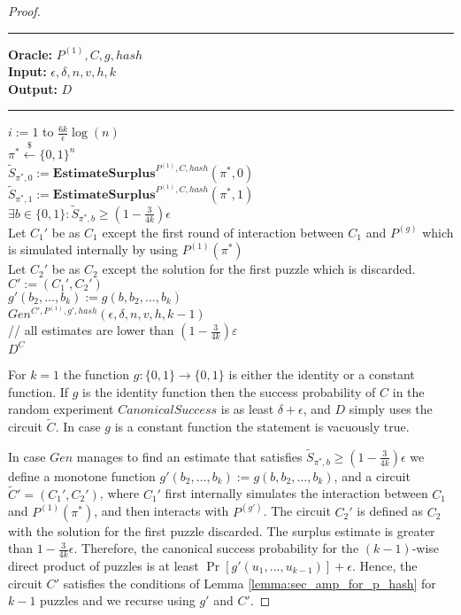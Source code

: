 \begin{proof}
\begin{codeblock}
  \medskip
  \hrule
  \medskip
  \textbf{Oracle:} $ P^{(1)}, C, g, hash$ \\
  \textbf{Input:}  $\epsilon, \delta, n, v, h, k$\\
  \textbf{Output:} $D$
  \medskip\hrule\medskip
  \For $i:=1$ to $\frac{6k}{\epsilon}\log(n)$ \Do \\
  \IndI $\pi^* \xleftarrow{\$} \{0,1\}^{n}$\\
  \IndI $\widetilde{S}_{\pi^*,0} := \textbf{EstimateSurplus}^{P^{(1)}, C, hash}(\pi^*, 0)$\\
  \IndI $\widetilde{S}_{\pi^*,1} := \textbf{EstimateSurplus}^{P^{(1)}, C, hash}(\pi^*, 1)$\\
  \IndI \If $ \exists b \in \{0,1\}: \widetilde{S}_{\pi^*,b} \geq (1 - \frac{3}{4k}) \epsilon$ \then \\
  \IndII Let $C_1'$ be as $C_1$ except the first round of interaction between $C_1$ and $P^{(g)}$ which \\
  \IndII is simulated internally by using $P^{(1)}(\pi^*)$\\
  \IndII Let $C_2'$ be as $C_2$ except the solution for the first puzzle which is discarded. \\
  \IndII $C' := (C_1', C_2')$ \\
  \IndII $g'(b_2, \dots, b_k) := g(b, b_2, \dots, b_k)$\\
  \IndII\return $Gen^{C', P^{(1)}, g', hash}(\epsilon, \delta, n, v, h, k-1)$ \\
  // all estimates are lower than $(1-\frac{3}{4k})\varepsilon$\\
  \return $D^{C}$
\end{codeblock}
For $k=1$ the function $g: \{0,1\} \rightarrow \{0,1\}$ is either the identity or a constant function.
If $g$ is the identity function then the success probability of $C$ in the random experiment $CanonicalSuccess$ is as least $\delta + \epsilon$,
and $D$ simply uses the circuit $\widetilde{C}$. In case $g$ is a constant function the statement is vacuously true.

In case $Gen$ manages to find an estimate that satisfies $\widetilde{S}_{\pi^*,b} \geq (1-\frac{3}{4k})\epsilon$
we define a monotone function $g'(b_2, \dots, b_k) := g(b, b_2, \dots, b_k)$,
and a circuit $\widetilde{C}' = (C_1', C_2')$, where
$C_1'$ first internally simulates the interaction between $C_1$ and $P^{(1)}(\pi^*)$, and then interacts with $P^{(g')}$.
The circuit $C_2'$ is defined as $C_2$ with the solution for the first puzzle discarded.
The surplus estimate is greater than $1 - \frac{3}{4k}\epsilon$.
Therefore, the canonical success probability for the $(k-1)$-wise direct product of puzzles is at least $\underset{}{\Pr}[g'(u_1,\dots, u_{k-1} )] + \epsilon$.
Hence, the circuit $C'$ satisfies the conditions of Lemma \ref{lemma:sec_amp_for_p_hash} for $k-1$ puzzles and we recurse using $g'$ and $C'$.


\end{proof}
